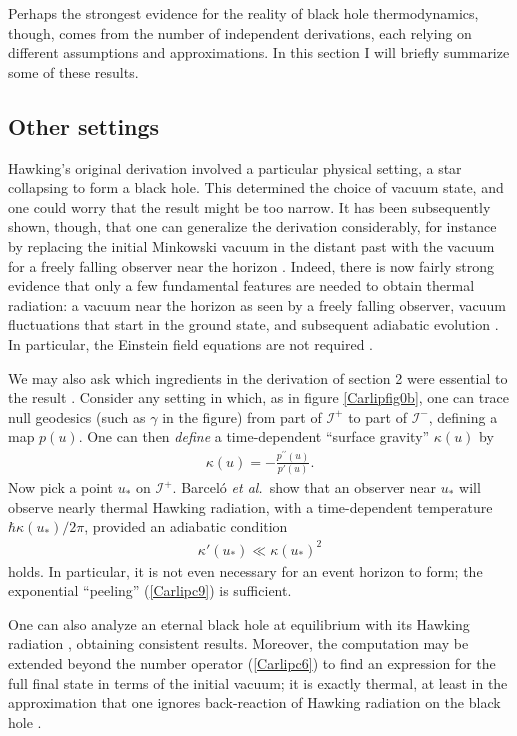 \documentclass[12pt]{article}
\begin{document}
Perhaps the strongest evidence for the reality of black hole thermodynamics,
though, comes from the number of independent derivations, each relying on
different assumptions and approximations.  In this section I will briefly 
summarize some of these results.

\subsection{Other settings \label{othera}}

Hawking's original derivation involved a particular physical setting, a star
collapsing to form a black hole.  This determined the choice of 
vacuum state, and one could worry that the result might be too narrow.  
It has been subsequently shown, though, that one can generalize the
derivation considerably, for instance by replacing the initial Minkowski 
vacuum in the distant past with the vacuum for a freely falling observer 
near the horizon \cite{Unruhc}.  Indeed, there is now fairly strong evidence 
that only a few fundamental features are needed to obtain thermal 
radiation: a vacuum near the horizon as seen by a freely falling observer, 
vacuum fluctuations that start in the ground state, and subsequent 
adiabatic evolution \cite{Schutzhold,Visser}.  In particular, the Einstein
field equations are not required \cite{Visser_essential}.

We may also ask which ingredients in the derivation of section 
2 were essential to the result \cite{BLSV}.  Consider any
setting in which, as in figure \ref{Carlipfig0b}, one can trace null
geodesics (such as $\gamma$ in the figure) from part of $\mathcal{I}^+$
to part of $\mathcal{I}^-$, defining a map $p(u)$.  One can then 
\emph{define} a time-dependent ``surface gravity'' $\kappa(u)$ by
\begin{align}
\kappa(u) = -\frac{p^{\prime\prime}(u)}{p'(u)}  .
\label{Carlipe0}
\end{align}
Now pick a point $u_*$ on $\mathcal{I}^+$.  Barcel{\'o} {\it et al.}\
show \cite{BLSV} that an observer near $u_*$ will observe
nearly thermal Hawking radiation, with a time-dependent temperature
$\hbar\kappa(u_*)/2\pi$, provided an adiabatic condition
\begin{align} 
\kappa'(u_*)\ll \kappa(u_*)^2
\label{Carlipe0a}
\end{align}
holds.  In particular, it is not even necessary for an event horizon to
form; the exponential ``peeling'' (\ref{Carlipc9}) is sufficient.

One can also analyze an eternal black 
hole at equilibrium with its Hawking radiation \cite{HartleHawking},
obtaining consistent results.  Moreover, the computation may
be extended beyond the number operator (\ref{Carlipc6}) to find an 
expression for the full final state in terms of the initial vacuum; 
it is exactly thermal, at least in the approximation that one ignores 
back-reaction of Hawking radiation on the black hole \cite{Wald,Parkerb}.
\end{document}
